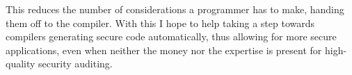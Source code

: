 This reduces the number of considerations a programmer has to make, handing them off to the compiler.
With this I hope to help taking a step towards compilers generating secure code automatically, thus allowing for more secure applications, even when neither the money nor the expertise is present for high-quality security auditing.
